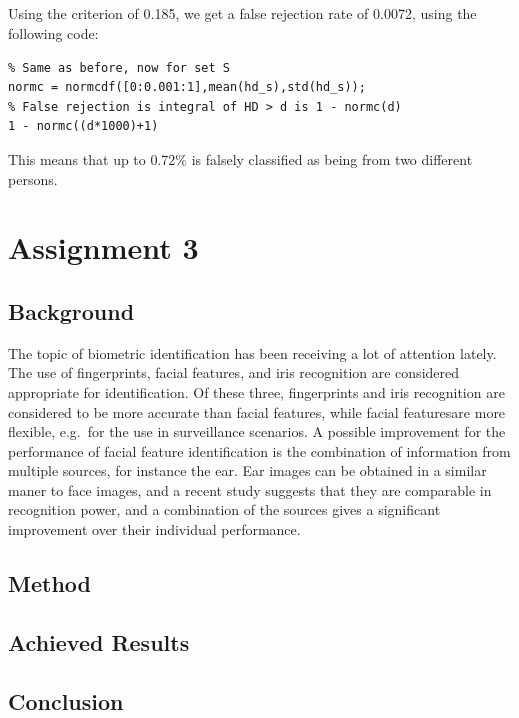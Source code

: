 \documentclass{article}
\begin{document}
\subsection{}
Using the criterion of 0.185, we get a false rejection rate of 0.0072, using the following code:
\begin{lstlisting}
% Same as before, now for set S
normc = normcdf([0:0.001:1],mean(hd_s),std(hd_s));
% False rejection is integral of HD > d is 1 - normc(d)
1 - normc((d*1000)+1)
\end{lstlisting}
This means that up to 0.72\% is falsely classified as being from two different persons.

\section{Assignment 3}
\subsection{Background}
The topic of biometric identification has been receiving a lot of attention lately. %
The use of fingerprints, facial features, and iris recognition are considered appropriate for identification.
Of these three, fingerprints and iris recognition are considered to be more accurate than facial features,
while facial featuresare more flexible, e.g.\ for the use in surveillance scenarios.
A possible improvement for the performance of facial feature identification is the combination of information from multiple sources,
for instance the ear.
Ear images can be obtained in a similar maner to face images, 
and a recent study suggests that they are comparable in recognition power\cite{chang2003comparison},
and a combination of the sources gives a significant improvement over their individual performance.
\subsection{Method}
\subsection{Achieved Results}
\subsection{Conclusion}



\end{document}
